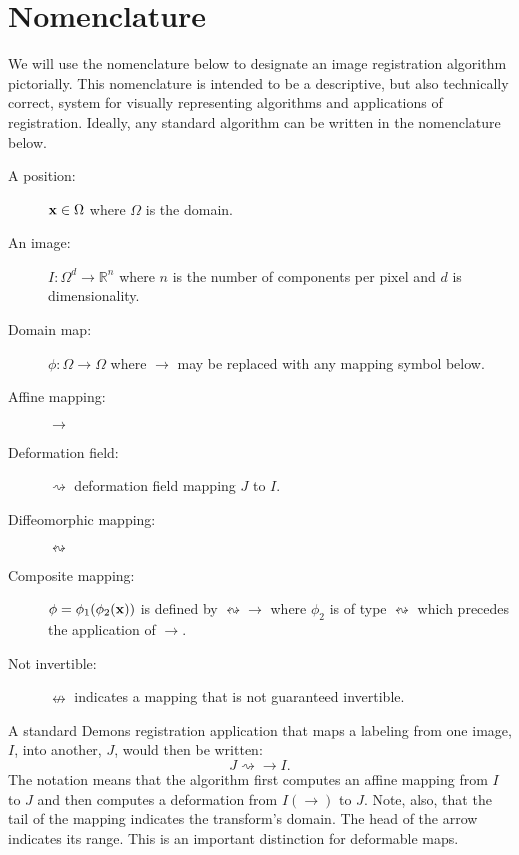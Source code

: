 \documentclass{article}
\begin{document}
\section{Nomenclature}
We will use the nomenclature below to designate an image registration
algorithm pictorially.  This nomenclature is intended to be a
descriptive, but also technically correct, system for visually
representing algorithms and applications of registration.  Ideally,
any standard algorithm can be written in the nomenclature below.
\begin{description}
\item [A position:] ${\bf x} \in \Omega$ where $\Omega$ is the domain. 
\item [An image:]  $ I \colon \Omega^d \to \mathbb{R}^n$ where $n$ is the
  number of components per pixel and $d$ is dimensionality.
\item [Domain map:] $ \phi \colon \Omega  \to \Omega $ where $\to$ may be
  replaced with any mapping symbol below. 
\item [Affine mapping:] $\rightarrow$
\item [Deformation field:] $ \rightsquigarrow$ deformation field mapping $J$
  to $I$.
\item [Diffeomorphic mapping:] $ \leftrightsquigarrow$ 
\item [Composite mapping:] $\phi=\phi_1(\phi_2({\bf x}))$ is defined by $\leftrightsquigarrow
  \rightarrow$ where $\phi_2$ is of type $\leftrightsquigarrow$ which precedes the application of $\rightarrow$.
\item[Not invertible:]  $\nleftrightarrow$ indicates a mapping that is
  not guaranteed invertible.
\end{description}
A standard Demons registration application that maps a labeling from
one image, $I$, into another, $J$, would then be written:
$$
J \rightsquigarrow \rightarrow  I .
$$
The notation means that the algorithm first computes an affine mapping
from $I$ to $J$ and then computes a deformation from $I( \rightarrow )$
to $J$.  Note, also, that the tail of the mapping indicates the
transform's domain.  The head of the arrow indicates its range.  This
is an important distinction for deformable maps. 
\end{document}
